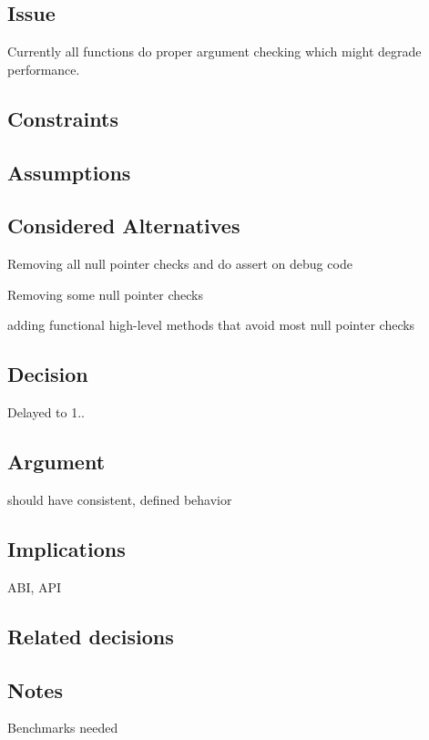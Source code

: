 \subsection*{Issue}

Currently all functions do proper argument checking which might degrade performance.

\subsection*{Constraints}

\subsection*{Assumptions}

\subsection*{Considered Alternatives}


\begin{DoxyItemize}
\item Removing all null pointer checks and do assert on debug code
\item Removing some null pointer checks
\item adding functional high-\/level methods that avoid most null pointer checks
\end{DoxyItemize}

\subsection*{Decision}

Delayed to 1..

\subsection*{Argument}


\begin{DoxyItemize}
\item should have consistent, defined behavior
\end{DoxyItemize}

\subsection*{Implications}


\begin{DoxyItemize}
\item A\+B\+I, A\+P\+I
\end{DoxyItemize}

\subsection*{Related decisions}

\subsection*{Notes}


\begin{DoxyItemize}
\item Benchmarks needed 
\end{DoxyItemize}